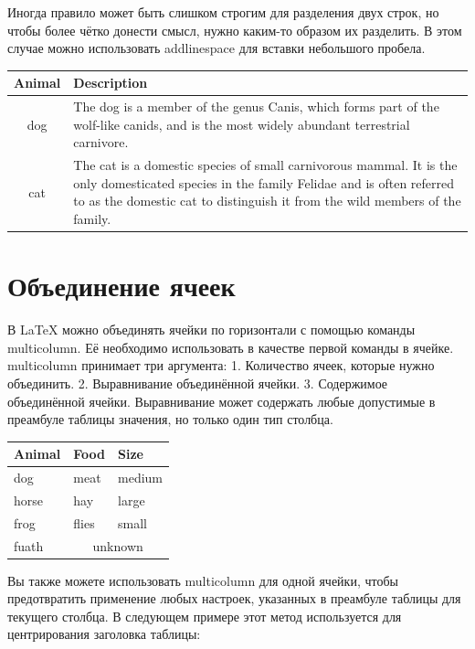 \documentclass{article}
\begin{document}
  \smallskip

  Иногда правило может быть слишком строгим для разделения двух строк, но чтобы более чётко донести смысл, нужно каким-то образом их разделить. В этом случае
  можно использовать addlinespace для вставки небольшого пробела.

  \smallskip

  \begin{tabular}{cp{9cm}}
  \toprule
    Animal & Description \\
  \midrule
    dog & The dog is a member of the genus Canis, which forms
     part of the
    wolf-like canids, and is the most widely abundant
     terrestrial
    carnivore. \\
  \addlinespace
    cat & The cat is a domestic species of small carnivorous
     mammal. It is the
    only domesticated species in the family Felidae and
     is often referred
    to as the domestic cat to distinguish it from the
     wild members of the
    family. \\
  \bottomrule
  \end{tabular}


  \section{Объединение ячеек}
  \label{sec:merge}
  
  В LaTeX можно объединять ячейки по горизонтали с помощью команды multicolumn.
  Её необходимо использовать в качестве первой команды в ячейке. multicolumn принимает три аргумента:
  1. Количество ячеек, которые нужно объединить.
  2. Выравнивание объединённой ячейки.
  3. Содержимое объединённой ячейки.
  Выравнивание может содержать любые допустимые в преамбуле таблицы значения, но только один тип столбца.


  \smallskip

  \begin{tabular}{lll}
  \toprule
    Animal & Food & Size \\
  \midrule
    dog & meat & medium \\
    horse & hay & large \\
    frog & flies & small \\
    fuath & \multicolumn{2}{c}{unknown} \\
  \bottomrule
  \end{tabular}

  \smallskip


  Вы также можете использовать multicolumn для одной ячейки, 
  чтобы предотвратить применение любых настроек, указанных в преамбуле таблицы для текущего столбца. 
  В следующем примере этот метод используется для центрирования заголовка таблицы:
\end{document}
